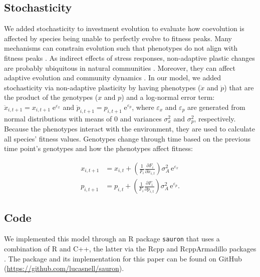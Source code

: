 \subsection*{Stochasticity}

We added stochasticity to investment evolution to evaluate how coevolution
is affected by species being unable to perfectly evolve to fitness peaks.
Many mechanisms can constrain evolution such that phenotypes do not 
align with fitness peaks
\citep[e.g., behavioral syndromes, pleiotropy, time
lags;][]{Langerhans2002,Sih2004,Padilla1996}.
As indirect effects of stress responses, non-adaptive plastic
changes are probably ubiquitous in natural communities
\citep{Miner2005,Ghalambor2007}.
Moreover, they can affect adaptive evolution \citep{Ghalambor2015a}
and community dynamics \citep{Langerhans2002,Peacor2006}.
In our model, we added stochasticity via non-adaptive plasticity
by having phenotypes ($\ddot{x}$ and $\ddot{p}$) 
that are the product of the genotypes (${x}$ and ${p}$) and a log-normal
error term:
$\ddot{x}_{i,t+1} = x_{i,t+1} \; \text{e}^{\varepsilon_x}$ and
$\ddot{p}_{i,t+1} = p_{i,t+1} \; \text{e}^{\varepsilon_p}$,
where $\varepsilon_x$ and $\varepsilon_p$ are generated from normal
distributions with means of 0 and variances $\sigma^2_{x}$ and $\sigma^2_{p}$,
respectively.
Because the phenotypes interact with the environment, they are used
to calculate all species' fitness values.
Genotypes change through time based on the previous time point's 
genotypes and how the phenotypes affect fitness:

\begin{equation} \label{eq:invest-change-stochastic}
\begin{split}
    x_{i,t+1} &= x_{i,t} + \left( \frac{1}{F_i}
        \frac{\partial F_i}{\partial \ddot{x}_{i,t}} \right) \sigma^2_A \, \text{e}^{\varepsilon_x} \\
    p_{i,t+1} &= p_{i,t} + \left( \frac{1}{F_i}
        \frac{\partial F_i}{\partial \ddot{p}_{i,t}} \right) \sigma^2_A \, \text{e}^{\varepsilon_p}
    \textrm{.}
\end{split}
\end{equation}





\subsection*{Code}

We implemented this model through an R package \texttt{sauron}
that uses a combination of R \citep{RCoreTeam2020} and
C++, the latter via the Rcpp and RcppArmadillo packages
\citep{Eddelbuettel2014a,Eddelbuettel2013a,Sanderson2016}.
The package and its implementation for this paper can be found on GitHub
(\url{https://github.com/lucasnell/sauron}).



